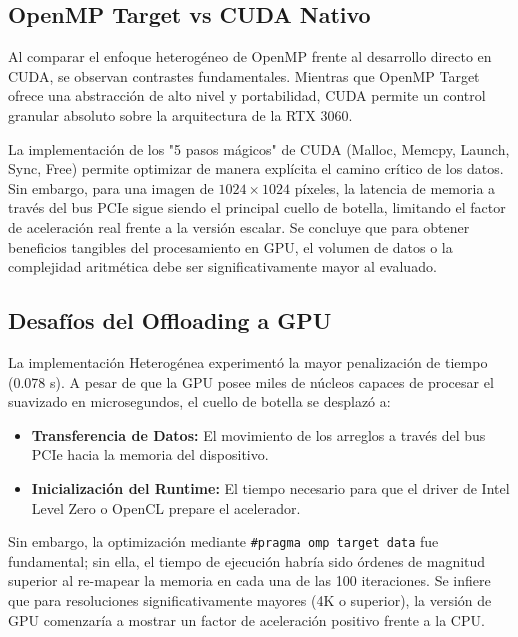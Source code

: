 \subsection{OpenMP Target vs CUDA Nativo}
Al comparar el enfoque heterogéneo de OpenMP frente al desarrollo directo en CUDA, se observan contrastes fundamentales. Mientras que OpenMP Target ofrece una abstracción de alto nivel y portabilidad, CUDA permite un control granular absoluto sobre la arquitectura de la RTX 3060. 

La implementación de los "5 pasos mágicos" de CUDA (Malloc, Memcpy, Launch, Sync, Free) permite optimizar de manera explícita el camino crítico de los datos. Sin embargo, para una imagen de $1024 \times 1024$ píxeles, la latencia de memoria a través del bus PCIe sigue siendo el principal cuello de botella, limitando el factor de aceleración real frente a la versión escalar. Se concluye que para obtener beneficios tangibles del procesamiento en GPU, el volumen de datos o la complejidad aritmética debe ser significativamente mayor al evaluado.

\subsection{Desafíos del Offloading a GPU}
La implementación Heterogénea experimentó la mayor penalización de tiempo (0.078 s). A pesar de que la GPU posee miles de núcleos capaces de procesar el suavizado en microsegundos, el cuello de botella se desplazó a:
\begin{itemize}
    \item \textbf{Transferencia de Datos:} El movimiento de los arreglos a través del bus PCIe hacia la memoria del dispositivo.
    \item \textbf{Inicialización del Runtime:} El tiempo necesario para que el driver de Intel Level Zero o OpenCL prepare el acelerador.
\end{itemize}

Sin embargo, la optimización mediante \texttt{\#pragma omp target data} fue fundamental; sin ella, el tiempo de ejecución habría sido órdenes de magnitud superior al re-mapear la memoria en cada una de las 100 iteraciones. Se infiere que para resoluciones significativamente mayores (4K o superior), la versión de GPU comenzaría a mostrar un factor de aceleración positivo frente a la CPU.